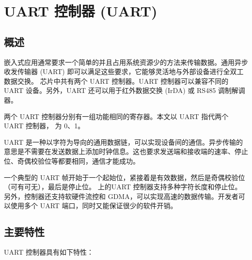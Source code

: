 \documentclass[main\_\_CN.tex]{subfiles}
\begin{document}

\ifglobal
\else
    {\let\clearpage\relax \listoftodos}
    {\let\clearpage\relax \listofdonetodos}
    \tableofcontents
\fi



\hypertarget{uart}{}
\chapter{UART 控制器 (UART)}
\label{mod:uart}

\section{概述}

嵌入式应用通常要求一个简单的并且占用系统资源少的方法来传输数据。通用异步收发传输器 (UART) 即可以满足这些要求，它能够灵活地与外部设备进行全双工数据交换。\chipname{} 芯片中共有两个 UART 控制器。UART 控制器可以兼容不同的 UART 设备。另外，UART 还可以用于红外数据交换 (IrDA) 或 RS485 调制解调器。

两个 UART 控制器分别有一组功能相同的寄存器。本文以 UART 指代两个 UART 控制器， 为 0、1。

UART 是一种以字符为导向的通用数据链，可以实现设备间的通信。异步传输的意思是不需要在发送数据上添加时钟信息。这也要求发送端和接收端的速率、停止位、奇偶校验位等都要相同，通信才能成功。

一个典型的 UART 帧开始于一个起始位，紧接着是有效数据，然后是奇偶校验位（可有可无），最后是停止位。\chipname{} 上的UART 控制器支持多种字符长度和停止位。另外，控制器还支持软硬件流控和 GDMA，可以实现高速的数据传输。开发者可以使用多个 UART 端口，同时又能保证很少的软件开销。

\section{主要特性}

UART 控制器具有如下特性：
\end{document}
